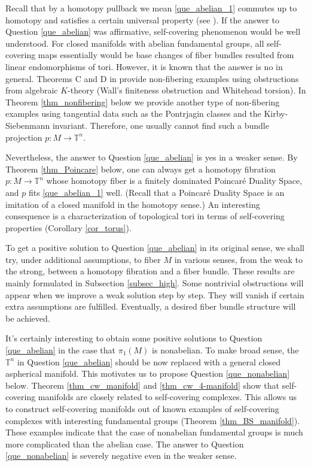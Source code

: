 \documentclass[12pt]{amsart}
\theoremstyle{plain}
\theoremstyle{definition}
\theoremstyle{question}
\theoremstyle{remark}
\theoremstyle{assumption}
\numberwithin{equation}{section}
\theoremstyle{bigthm}
\begin{document}
Recall that by a homotopy pullback we mean \eqref{que_abelian_1} commutes up to homotopy and satisfies a certain universal property (see \cite[p.~205]{Arkowitz}). If the answer to Question \ref{que_abelian} was affirmative, self-covering phenomenon would be well understood. For closed manifolds with abelian fundamental groups, all self-covering maps essentially would be base changes of fiber bundles resulted from linear endomorphisms of tori. However, it is known that the answer is no in general. Theorems C and D in \cite{Qin_Su_Wang} provide non-fibering examples using obstructions from algebraic $K$-theory (Wall's finiteness obstruction and Whitehead torsion). In Theorem \ref{thm_nonfibering} below we provide another type of non-fibering examples using tangential data such as the Pontrjagin classes and the Kirby-Siebenmann invariant. Therefore, one usually cannot find such a bundle projection $p \colon  M \rightarrow \mathbb{T}^{n}$.

Nevertheless, the answer to Question \ref{que_abelian} is yes in a weaker sense. By Theorem \ref{thm_Poincare} below, one can always get a homotopy fibration $p \colon  M \rightarrow \mathbb{T}^{n}$ whose homotopy fiber is a finitely dominated Poincar\'{e} Duality Space, and $p$ fits \eqref{que_abelian_1} well. (Recall that a Poincar\'{e} Duality Space is an imitation of a closed manifold in the homotopy sense.) An interesting consequence is a characterization of topological tori in terms of self-covering properties (Corollary \ref{cor_torus}).

To get a positive solution to Question \ref{que_abelian} in its original sense, we shall try, under additional assumptions, to fiber $M$ in various senses, from the weak to the strong, between a homotopy fibration and a fiber bundle. These results are mainly formulated in Subsection \ref{subsec_high}. Some nontrivial obstructions will appear when we improve a weak solution step by step. They will vanish if certain extra assumptions are fulfilled. Eventually, a desired fiber bundle structure will be achieved.

It's certainly interesting to obtain some positive solutions to Question \ref{que_abelian} in the case that $\pi_{1} (M)$ is nonabelian. To make broad sense, the $\mathbb{T}^{n}$ in Question \ref{que_abelian} should be now replaced with a general closed aspherical manifold. This motivates us to propose Question \ref{que_nonabelian} below. Theorem \ref{thm_cw_manifold} and \ref{thm_cw_4-manifold} show that self-covering manifolds are closely related to self-covering complexes. This allows us to construct self-covering manifolds out of known examples of self-covering complexes with interesting fundamental groups (Theorem \ref{thm_BS_manifold}). These examples indicate that the case of nonabelian fundamental groups is much more complicated than the abelian case. The answer to Question \ref{que_nonabelian} is severely negative even in the weaker sense.
\end{document}
